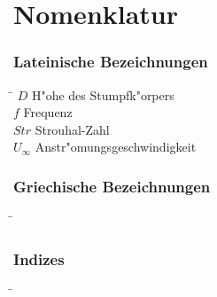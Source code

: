 \chapter*{Nomenklatur}

\subsection*{Lateinische Bezeichnungen}
\begin{tabbing}
\hspace*{2cm}\=\kill
$D$ \> H"ohe des Stumpfk"orpers \\[0.2ex]
$f$ \> Frequenz \\[0.2ex]
$Str$ \> Strouhal-Zahl \\[0.2ex]
$U_{\infty}$ \> Anstr"omungsgeschwindigkeit \\[0.2ex]
\end{tabbing}



\subsection*{Griechische Bezeichnungen}
\begin{tabbing}
\hspace*{2cm}\=\kill
\end{tabbing}



\subsection*{Indizes}
\begin{tabbing}
\hspace*{2cm}\=\kill
\end{tabbing}



